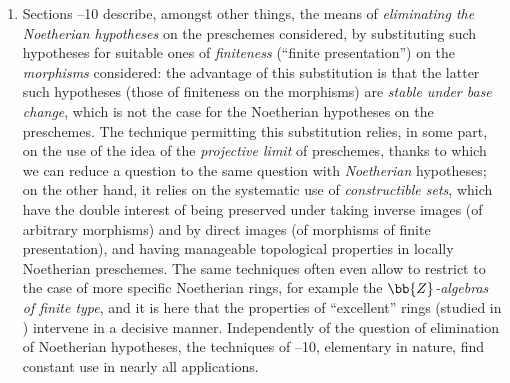 \begin{enumerate}
\begin{enumerate}
        Recall that  constitutes a ``'' theory of Noetherian local rings, not much used in what follows in the chapter.
      \item[(c3)] Sections \textsection{}--10 describe, amongst other things, the means of \emph{eliminating the Noetherian hypotheses} on the preschemes considered, by substituting such hypotheses for suitable ones of \emph{finiteness} (``finite presentation'') on the \emph{morphisms} considered: the advantage of this substitution is that the latter such hypotheses (those of finiteness on the morphisms) are \emph{stable under base change}, which is not the case for the Noetherian hypotheses on the preschemes.
        The technique permitting this substitution relies, in some part, on the use of the idea of the \emph{projective limit} of preschemes, thanks to which we can reduce a question to the same question with \emph{Noetherian} hypotheses; on the other hand, it relies on the systematic use of \emph{constructible sets}, which have the double interest of being preserved under taking inverse images (of arbitrary morphisms)
        and by direct images (of morphisms of finite presentation), and having manageable topological properties in locally Noetherian preschemes.
        The same techniques often even allow to restrict to the case of more specific Noetherian rings, for example the \emph{$\bb{Z}$-algebras of finite type}, and it is here that the properties of ``excellent'' rings (studied in ) intervene in a decisive manner.
        Independently of the question of elimination of Noetherian hypotheses, the techniques of \textsection{}--10, elementary in nature, find constant use in nearly all applications.
    \end{enumerate}
\end{enumerate}




























